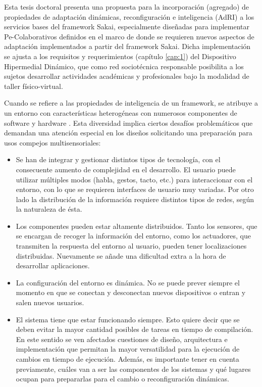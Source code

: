 {Esta tesis doctoral presenta una propuesta para la incorporación (agregado) de
propiedades  de adaptación dinámicas, reconfiguración e inteligencia
(AdRI) \label{AdRI} a los servicios bases del framework Sakai,
especialmente diseñadas para implementar Pe-Colaborativos definidos en el marco
de \cite{cacic2007.9} donde se requieren nuevos aspectos de adaptación
\cite{librounq} implementados a partir del framework Sakai. Dicha
implementación se ajusta a los requisitos y requerimientos
(capítulo \ref{cap:1}) del Dispositivo
Hipermedial Dinámico, que como red sociotécnica responsable posibilita a los sujetos desarrollar actividades académicas y profesionales bajo la modalidad de taller físico-virtual.  

Cuando se refiere a las propiedades de inteligencia de un framework, se atribuye a un entorno con características  heterogéneas con numerosos
componentes de software y hardware \cite{cap1.133}. Esta diversidad implica ciertos
desafíos problemáticos que demandan una atención especial en los diseños solicitando una preparación para usos compejos multisensoriales:

\begin{itemize} 
 
\item
Se han de integrar y gestionar distintos tipos de tecnología, con
el consecuente aumento de complejidad en el desarrollo. El usuario puede
utilizar múltiples modos (habla, gestos, tacto, etc.) para interaccionar con
el entorno, con lo que se requieren interfaces de usuario muy variadas. Por
otro lado la distribución de la información requiere distintos tipos de redes,
según la naturaleza de ésta.

\item
Los componentes pueden estar altamente distribuidos. Tanto los
sensores, que se encargan de recoger la información del entorno, como los
actuadores, que transmiten la respuesta del entorno al usuario, pueden
tener localizaciones distribuidas. Nuevamente se añade una dificultad extra a la
hora de desarrollar aplicaciones.

\item
La configuración del entorno es dinámica. No se puede prever siempre
el momento en que se conectan y desconectan nuevos dispositivos o entran
y salen nuevos usuarios.

\item
El sistema tiene que estar funcionando siempre. Esto quiere decir que se
deben evitar la mayor cantidad posibles de tareas en tiempo de compilación. En
este sentido se ven afectados cuestiones de diseño, arquitectura e
implementación que permitan la mayor versatilidad para la ejecución de
cambios en tiempo de ejecución. Además, es importante tener en cuenta
previamente, cuáles van a ser las componentes de los sistemas y qué lugares
ocupan para prepararlas para el cambio o reconfiguración dinámicas. 


\end{itemize}}
